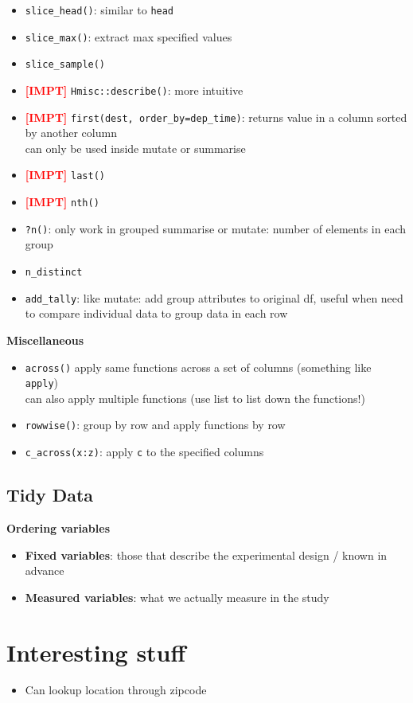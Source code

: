 \documentclass{article}
\newcommand{\impt}[0]{\textcolor{red}{\textbf{[IMPT] }}}
\begin{document}
\begin{multicols}{2}
\begin{itemize}
	\item \texttt{slice\_head()}: similar to \texttt{head}
	\item \texttt{slice\_max()}: extract max specified values
	\item \texttt{slice\_sample()}
	\item \impt \texttt{Hmisc::describe()}: more intuitive
	\item \impt \texttt{first(dest, order\_by=dep\_time)}: returns value in a column sorted by another column\\
	can only be used inside mutate or summarise
	\item \impt \texttt{last()}
	\item \impt \texttt{nth()}
	\item \texttt{?n()}: only work in grouped summarise or mutate: number of elements in each group
	\item \texttt{n\_distinct}
	\item \texttt{add\_tally}: like mutate: add group attributes to original df, useful when need to compare individual data to group data in each row
\end{itemize}
\textbf{Miscellaneous}
\begin{itemize}
	\item \texttt{across()} apply same functions across a set of columns (something like \texttt{apply})\\
	can also apply multiple functions (use list to list down the functions!)
	\item \texttt{rowwise()}: group by row and apply functions by row
	\item \texttt{c\_across(x:z)}: apply \texttt{c} to the specified columns
\end{itemize}
\subsection{Tidy Data}
\textbf{Ordering variables}
\begin{itemize}
	\item \textbf{Fixed variables}: those that describe the experimental design / known in advance
	\item \textbf{Measured variables}: what we actually measure in the study
\end{itemize}

\section{Interesting stuff}
\begin{itemize}
	\item Can lookup location through zipcode
\end{itemize}
\end{multicols}
\end{document}
